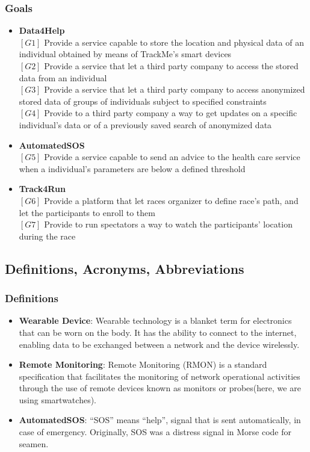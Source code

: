 \documentclass[12pt]{article}
\begin{document}
\subsubsection{Goals}
\begin{itemize}
\item{\textbf{Data4Help}}\\
$[G1]$ Provide a service capable to store the location and physical data of an individual obtained by means of TrackMe's smart devices\\
$[G2]$ Provide a service that let a third party company to access the stored data from an individual\\
$[G3]$ Provide a service that let a third party company to access anonymized stored data of groups of individuals subject to specified constraints\\
$[G4]$ Provide to a third party company a way to get updates on a specific individual's data or of a previously saved search of anonymized data\\

\item{\textbf{AutomatedSOS}}\\
$[G5]$ Provide a service capable to send an advice to the health care service when a individual's parameters are below a defined threshold\\

\item{\textbf{Track4Run}}\\
$[G6]$ Provide a platform that let races organizer to define race's path, and let the participants to enroll to them\\
$[G7]$ Provide to run spectators a way to watch the participants' location during the race\\
\end{itemize}

\subsection{Definitions, Acronyms, Abbreviations}
\subsubsection{Definitions}
\begin{itemize}
\item{} \textbf{Wearable Device}: Wearable technology is a blanket term for electronics that can be worn on the body. It has the ability to connect to the internet, enabling data to be exchanged between a network and the device wirelessly.

\item{} \textbf{Remote Monitoring}: Remote Monitoring (RMON) is a standard specification that facilitates the monitoring of network operational activities through the use of remote devices known as monitors or probes(here, we are using smartwatches).

\item{} \textbf{AutomatedSOS}: “SOS” means “help”, signal that is sent automatically, in case of emergency. Originally, SOS was a distress signal in Morse code for seamen.

\end{itemize}
\end{document}
